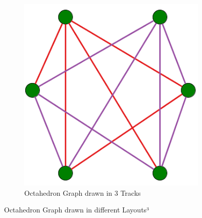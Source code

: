 \documentclass[bachelor, english]{algothesis}
\begin{document}
\begin{figure}[ht]
    \begin{subfigure}[b]{0.45\linewidth}
        \centering
        \includegraphics[width=0.8\linewidth]{figures/octahedron_tlp.png}
        \caption{Octahedron Graph drawn in 3 Tracks}
        \label{fig:octahedron_tlp}
    \end{subfigure}

    \caption{Octahedron Graph drawn in different Layouts³}
    \label{fig:octahedron_layouts}
\end{figure}

\clearpage
\end{document}
